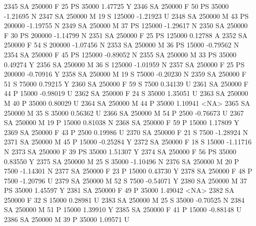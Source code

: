 \documentclass{article}
\begin{document}
\begin{Schunk}
\begin{Soutput}
2345     SA     250000   F  25        PS  35000   1.47725    Y
2346     SA     250000   F  50        PS  35000  -1.21695    N
2347     SA     250000   M  19         S 125000  -1.21923    U
2348     SA     250000   M  43        PS 200000  -1.19755    N
2349     SA     250000   M  37        PS 125000  -1.29617    N
2350     SA     250000   F  30        PS 200000  -1.14799    N
2351     SA     250000   F  25        PS 125000   0.12788    A
2352     SA     250000   F  54         S 200000  -1.07456    N
2353     SA     250000   M  36        PS  15000  -0.79562    N
2354     SA     250000   F  45        PS 125000  -0.89052    N
2355     SA     250000   M  33        PS  35000   0.49274    Y
2356     SA     250000   M  36         S 125000  -1.01959    N
2357     SA     250000   F  25        PS 200000  -0.70916    Y
2358     SA     250000   M  19         S  75000  -0.20230    N
2359     SA     250000   F  51         S  75000   0.79215    Y
2360     SA     250000   F  59         S   7500   0.34139    U
2361     SA     250000   F  44         P  15000  -0.98019    U
2362     SA     250000   F  24         S  35000   1.35051    U
2363     SA     250000   M  40         P  35000   0.80029    U
2364     SA     250000   M  44         P  35000   1.10941 <NA>
2365     SA     250000   M  35         S  35000   0.56362    U
2366     SA     250000   M  54         P   2500  -0.76673    U
2367     SA     250000   M  19         P  15000   0.81038    N
2368     SA     250000   F  59         P  15000   1.17809    Y
2369     SA     250000   F  43         P   2500   0.19986    U
2370     SA     250000   F  21         S   7500  -1.28924    N
2371     SA     250000   M  45         P  15000  -0.25284    Y
2372     SA     250000   F  18         S  15000  -1.11716    N
2373     SA     250000   F  39        PS  35000   1.51307    Y
2374     SA     250000   F  56        PS  35000   0.83550    Y
2375     SA     250000   M  25         S  35000  -1.10496    N
2376     SA     250000   M  20         P   7500  -1.14301    N
2377     SA     250000   F  23         P  15000   0.43730    Y
2378     SA     250000   F  48         P   7500  -1.20796    U
2379     SA     250000   M  52         S   7500  -0.54071    Y
2380     SA     250000   M  37        PS  35000   1.45597    Y
2381     SA     250000   F  49         P  35000   1.49042 <NA>
2382     SA     250000   F  32         S  15000   0.28981    U
2383     SA     250000   M  25         S  35000  -0.70525    N
2384     SA     250000   M  51         P  15000   1.39910    Y
2385     SA     250000   F  41         P  15000  -0.88148    U
2386     SA     250000   M  39         P  35000   1.09571    U

\end{Soutput}
\end{Schunk}
\end{document}
